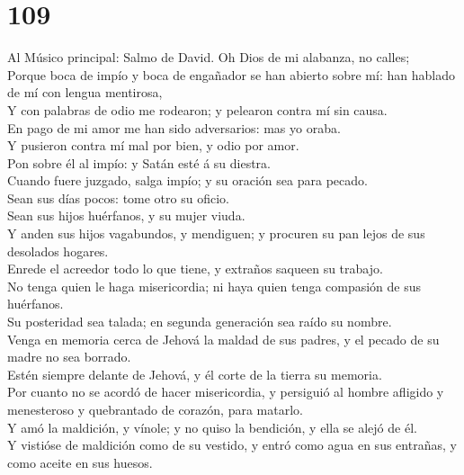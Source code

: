 \hypertarget{section-108}{%
\section{109}\label{section-108}}

 Al Músico principal: Salmo de David. Oh Dios de mi
alabanza, no calles;\\
 Porque boca de impío y boca de engañador se han abierto
sobre mí: han hablado de mí con lengua mentirosa,\\
 Y con palabras de odio me rodearon; y pelearon contra mí
sin causa.\\
 En pago de mi amor me han sido adversarios: mas yo
oraba.\\
 Y pusieron contra mí mal por bien, y odio por amor.\\
 Pon sobre él al impío: y Satán esté á su diestra.\\
 Cuando fuere juzgado, salga impío; y su oración sea para
pecado.\\
 Sean sus días pocos: tome otro su oficio.\\
 Sean sus hijos huérfanos, y su mujer viuda.\\
 Y anden sus hijos vagabundos, y mendiguen; y procuren su
pan lejos de sus desolados hogares.\\
 Enrede el acreedor todo lo que tiene, y extraños saqueen
su trabajo.\\
 No tenga quien le haga misericordia; ni haya quien tenga
compasión de sus huérfanos.\\
 Su posteridad sea talada; en segunda generación sea
raído su nombre.\\
 Venga en memoria cerca de Jehová la maldad de sus
padres, y el pecado de su madre no sea borrado.\\
 Estén siempre delante de Jehová, y él corte de la tierra
su memoria.\\
 Por cuanto no se acordó de hacer misericordia, y
persiguió al hombre afligido y menesteroso y quebrantado de corazón,
para matarlo.\\
 Y amó la maldición, y vínole; y no quiso la bendición, y
ella se alejó de él.\\
 Y vistióse de maldición como de su vestido, y entró como
agua en sus entrañas, y como aceite en sus huesos.\\
